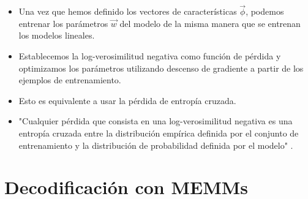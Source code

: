 \begin{itemize}

\item Una vez que hemos definido los vectores de características $\vec{\phi}$, podemos entrenar los parámetros $\vec{w}$ del modelo de la misma manera que se entrenan los modelos lineales.

\item Establecemos la log-verosimilitud negativa como función de pérdida y optimizamos los parámetros utilizando descenso de gradiente a partir de los ejemplos de entrenamiento.

\item Esto es equivalente a usar la pérdida de entropía cruzada.

\item "Cualquier pérdida que consista en una log-verosimilitud negativa es una entropía cruzada entre la distribución empírica definida por el conjunto de entrenamiento y la distribución de probabilidad definida por el modelo" \cite{goodfellow2016deep}.

\end{itemize}


\section{Decodificación con MEMMs}

